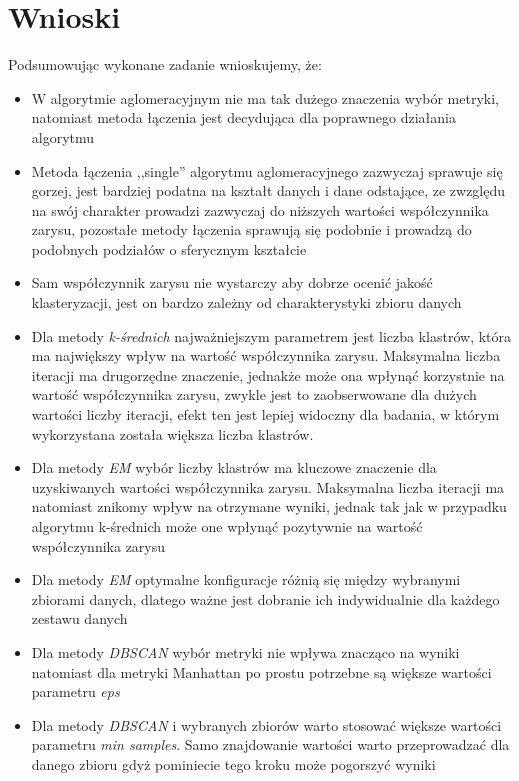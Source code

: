 \documentclass{classrep}
\begin{document}
    \section{Wnioski}
    \label{conclusions} {
        Podsumowując wykonane zadanie wnioskujemy, że:
        \begin{itemize}
            \item W algorytmie aglomeracyjnym nie ma tak dużego znaczenia wybór
            metryki, natomiast metoda łączenia jest decydująca dla poprawnego
            działania algorytmu
            \item Metoda łączenia ,,single'' algorytmu aglomeracyjnego zazwyczaj
            sprawuje się gorzej, jest bardziej podatna na kształt danych i dane
            odstające, ze zwzględu na swój charakter prowadzi zazwyczaj do
            niższych wartości współczynnika zarysu, pozostałe metody łączenia
            sprawują się podobnie i prowadzą do podobnych podziałów o sferycznym
            kształcie
            \item Sam współczynnik zarysu nie wystarczy aby dobrze ocenić jakość
            klasteryzacji, jest on bardzo zależny od charakterystyki zbioru danych
            \item Dla metody \textit{k-średnich} najważniejszym parametrem jest liczba
            klastrów, która ma największy wpływ na wartość współczynnika zarysu.
            Maksymalna liczba iteracji ma drugorzędne znaczenie, jednakże może ona
            wpłynąć korzystnie na wartość współczynnika zarysu, zwykle jest to
            zaobserwowane dla dużych wartości liczby iteracji, efekt ten jest lepiej
            widoczny dla badania, w którym wykorzystana została większa liczba klastrów.
            \item Dla metody \textit{EM} wybór liczby klastrów ma kluczowe znaczenie dla
            uzyskiwanych wartości współczynnika zarysu. Maksymalna liczba iteracji ma
            natomiast znikomy wpływ na otrzymane wyniki, jednak tak jak w przypadku
            algorytmu k-średnich może one wpłynąć pozytywnie na wartość współczynnika zarysu
            \item Dla metody \textit{EM} optymalne konfiguracje różnią się między
            wybranymi zbiorami danych, dlatego ważne jest dobranie ich indywidualnie dla każdego zestawu danych
            \item Dla metody \textit{DBSCAN} wybór metryki nie wpływa znacząco na
            wyniki natomiast dla metryki Manhattan po prostu potrzebne są większe wartości
            parametru \textit{eps}
            \item Dla metody \textit{DBSCAN} i wybranych zbiorów warto stosować większe
            wartości parametru \textit{min samples}. Samo znajdowanie wartości warto
            przeprowadzać dla danego zbioru gdyż pominiecie tego kroku może pogorszyć
            wyniki

        \end{itemize}
    }
\end{document}
